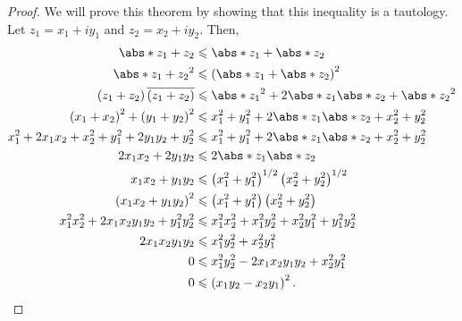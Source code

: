 \documentclass{article}
\begin{document}
\begin{proof}
    We will prove this theorem by showing that this inequality is a
    tautology. Let \(z_1 = x_1 + i y_1\) and \(z_2 = x_2 + i y_2\).
    Then,
    \begin{align*}
        \abs*{z_1 + z_2}                                             & \leqslant \abs*{z_1} + \abs*{z_2}                                               \\
        \abs*{z_1 + z_2}^2                                           & \leqslant \left( \abs*{z_1} + \abs*{z_2} \right)^2                              \\
        \left( z_1 + z_2 \right) \overline{\left( z_1 + z_2 \right)} & \leqslant \abs*{z_1}^2 + 2 \abs*{z_1} \abs*{z_2} + \abs*{z_2}^2                 \\
        \left( x_1 + x_2 \right)^2 + \left( y_1 + y_2 \right)^2      & \leqslant x_1^2 + y_1^2 + 2 \abs*{z_1} \abs*{z_2} + x_2^2 + y_2^2               \\
        x_1^2 + 2 x_1 x_2 + x_2^2 + y_1^2 + 2 y_1 y_2 + y_2^2        & \leqslant x_1^2 + y_1^2 + 2 \abs*{z_1} \abs*{z_2} + x_2^2 + y_2^2               \\
        2 x_1 x_2 + 2 y_1 y_2                                        & \leqslant 2 \abs*{z_1} \abs*{z_2}                                               \\
        x_1 x_2 + y_1 y_2                                            & \leqslant \left( x_1^2 + y_1^2 \right)^{1/2} \left( x_2^2 + y_2^2 \right)^{1/2} \\
        \left( x_1 x_2 + y_1 y_2 \right)^2                           & \leqslant \left( x_1^2 + y_1^2 \right) \left( x_2^2 + y_2^2 \right)             \\
        x_1^2 x_2^2 + 2 x_1 x_2 y_1 y_2 + y_1^2 y_2^2                & \leqslant x_1^2 x_2^2 + x_1^2 y_2^2 + x_2^2 y_1^2 + y_1^2 y_2^2                 \\
        2 x_1 x_2 y_1 y_2                                            & \leqslant x_1^2 y_2^2 + x_2^2 y_1^2                                             \\
        0                                                            & \leqslant x_1^2 y_2^2 - 2 x_1 x_2 y_1 y_2 + x_2^2 y_1^2                         \\
        0                                                            & \leqslant \left( x_1 y_2 - x_2 y_1 \right)^2.
    \end{align*}
\end{proof}
\end{document}

